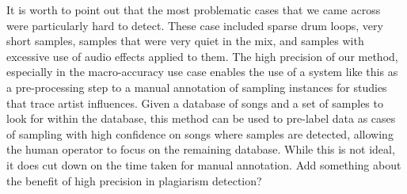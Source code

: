 \documentclass{article}
\begin{document}
It is worth to point out that the most problematic cases that we came across were particularly hard to detect. These case included sparse drum loops, very short samples, samples that were very quiet in the mix, and samples with excessive use of audio effects applied to them. %
The high precision of our method, especially in the macro-accuracy use case enables the use of a system like this as a pre-processing step to a manual annotation of sampling instances for studies that trace artist influences. Given a database of songs and a set of samples to look for within the database, this method can be used to pre-label data as cases of sampling with high confidence on songs where samples are detected, allowing the human operator to focus on the remaining database. While this is not ideal, it does cut down on the time taken for manual annotation. {\color{red} Add something about the benefit of high precision in plagiarism detection?}


\end{document}
